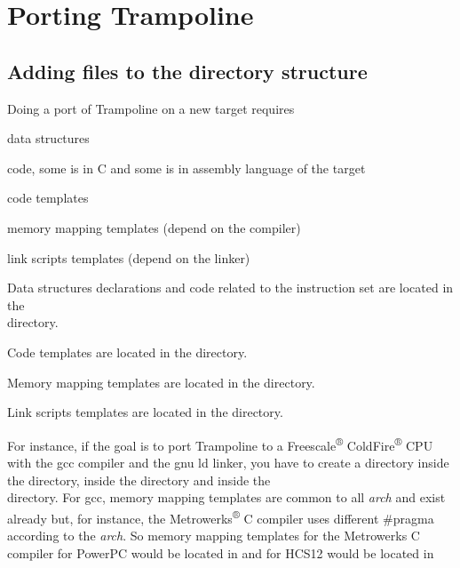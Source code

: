 
\chapter{Porting Trampoline}


\section{Adding files to the directory structure}

Doing a port of Trampoline on a new target requires

\begin{pitemize}
\item data structures
\item code, some is in C and some is in assembly language of the target
\item code templates
\item memory mapping templates (depend on the compiler)
\item link scripts templates (depend on the linker)
\end{pitemize}

Data structures declarations and code related to the instruction set are located in the\\  directory. 

Code templates are located in the  directory.

Memory mapping templates are located in the  directory.

Link scripts templates are located in the  directory.

For instance, if the goal is to port Trampoline to a Freescale\textsuperscript{®} ColdFire\textsuperscript{®} CPU with the gcc compiler and the gnu ld linker, you have to create a directory  inside the  directory, inside the  directory and inside the\\  directory. For gcc, memory mapping templates are common to all {\em arch} and exist already but, for instance, the Metrowerks\textsuperscript{®} C compiler uses different \#pragma according to the {\em arch}. So memory mapping templates for the Metrowerks C compiler for PowerPC would be located in  and for HCS12 would be located in 

